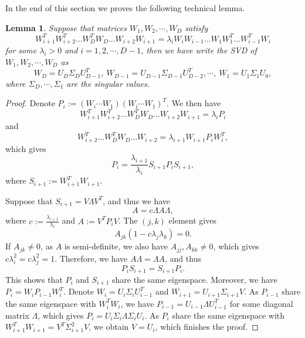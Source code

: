 \documentclass{article}
\theoremstyle{plain}
\newtheorem{lemma}{Lemma}
\begin{document}
In the end of this section we proves the following technical lemma.
\begin{lemma}
\label{lemma:decomposition}
Suppose that matrices $W_1,W_2,\cdots,W_D$ satisfy
\begin{equation}
W_{i+1}^TW_{i+2}^T...W_D^TW_D...W_{i+2}W_{i+1}=\lambda_iW_iW_{i-1}...W_1W_1^T...W_{i-1}^TW_i
\end{equation}
for some $\lambda_i>0$ and $i=1,2,\cdots,D-1$, then we have write the SVD of $W_1,W_2,\cdots,W_D$ as
\begin{equation}
W_D=U_D\Sigma_DU_{D-1}^T,\ W_{D-1}=U_{D-1}\Sigma_{D-1}U_{D-2}^T,\cdots,\ W_1=U_1\Sigma_1U_0,
\end{equation}
where $\Sigma_D,\cdots,\Sigma_1$ are the singular values.
\end{lemma}
\begin{proof}
Denote $P_i:=(W_i\cdots W_1)(W_i\cdots W_1)^T$. We then have
\begin{equation}
W_{i+1}^TW_{i+2}^T...W_D^TW_D...W_{i+2}W_{i+1}=\lambda_iP_i
\end{equation}
and
\begin{equation}
W_{i+2}^T...W_D^TW_D...W_{i+2}=\lambda_{i+1}W_{i+1}P_iW_i^T,
\end{equation}
which gives
\begin{equation}
P_i=\frac{\lambda_{i+1}}{\lambda_i}S_{i+1}P_iS_{i+1},
\end{equation}
where $S_{i+1}:=W_{i+1}^TW_{i+1}.$

Suppose that $S_{i+1}=V\Lambda V^T$, and thus we have
\begin{equation}
A=c\Lambda A\Lambda,
\end{equation}
where $c:=\frac{\lambda_{i+1}}{\lambda_i}$ and $A:=V^TP_iV$. The $(j,k)$ element gives
\begin{equation}
A_{jk}(1-c\lambda_j\lambda_k)=0.
\end{equation}
If $A_{jk}\neq0$, as $A$ is semi-definite, we also have $A_{jj},A_{kk}\neq0$, which gives $c\lambda_i^2=c\lambda_j^2=1$. Therefore, we have $A\Lambda=\Lambda A$, and thus
\begin{equation}
P_iS_{i+1}=S_{i+1}P_i.
\end{equation}
This shows that $P_i$ and $S_{i+1}$ share the same eigenspace. Moreover, we have $P_i=W_iP_{i-1}W_i^T$. Denote $W_i=U_i\Sigma_iU_{i-1}^T$ and $W_{i+1}=U_{i+1}\Sigma_{i+1}V$. As $P_{i-1}$ share the same eigenspace with $W_i^TW_i$, we have $P_{i-1}=U_{i-1}\Lambda U_{i-1}^T$ for some diagonal matrix $\Lambda$, which gives $P_i=U_i\Sigma_i\Lambda\Sigma_i U_i$. As $P_i$ share the same eigenspace with $W_{i+1}^TW_{i+1}=V^T\Sigma_{i+1}^2V$, we obtain $V=U_i$, which finishes the proof.
\end{proof}
\end{document}
